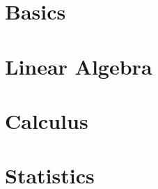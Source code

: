 \section[Basics]{Basics}

	
	
	

	

	

	

	

	

	


\section[LinAlg]{Linear Algebra}

	
	


	

	

	

	
	


\section[Calculus]{Calculus}

	
	

	

	

	

	

\section[Stats]{Statistics}

	

	

